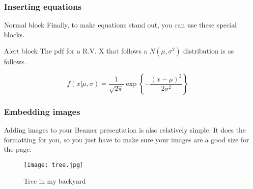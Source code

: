 \documentclass{beamer}
\begin{document}




\begin{frame}
\frametitle{Inserting equations}

\begin{block}{Normal block}
Finally, to make equations stand out, you can use these special blocks. \pause
\end{block}

\begin{alertblock}{Alert block}
The pdf for a R.V. X that follows a $N(\mu, \sigma^2)$ distribution is as follows. \pause
\end{alertblock}

\begin{examples}
\begin{equation*}
f(x| \mu, \sigma) = \frac{1}{\sqrt{2\pi}}\exp \left\{-\frac{(x-\mu)^2}{2\sigma^2}\right\}
\end{equation*}
\end{examples}

\end{frame}





\begin{frame}
\frametitle{Embedding images}

Adding images to your Beamer presentation is also relatively simple. \pause It does the formatting for you, so you just have to make sure your images are a good size for the page. \pause


\begin{figure}[b]
    \centering
    \texttt{[image: tree.jpg]}
    \caption{Tree in my backyard}
\end{figure}


\end{frame}




\end{document}
